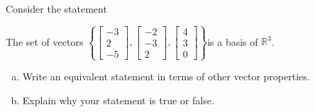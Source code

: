 
\begin{exerciseStatement}


Consider the statement 
\begin{center}\begin{minipage}{0.8\textwidth}
 The set of vectors \( \left\{ \left[\begin{array}{c}
-3 \\
2 \\
-5
\end{array}\right] , \left[\begin{array}{c}
-2 \\
-3 \\
2
\end{array}\right] , \left[\begin{array}{c}
4 \\
3 \\
0
\end{array}\right] \right\} \)is a basis of \(\mathbb{R}^3\). 
\end{minipage}\end{center}
    


\begin{enumerate}[(a)]
\item  Write an equivalent statement in terms of other vector properties.
\item  Explain why your statement is true or false.
\end{enumerate}
    
\end{exerciseStatement}
    
